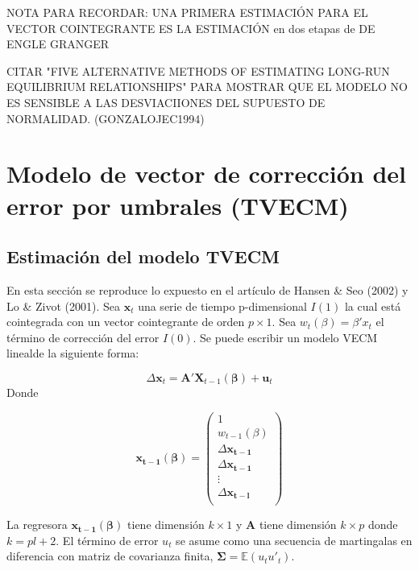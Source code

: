 \documentclass[12pt, twoside]{book}\usepackage[]{graphicx}\usepackage[]{color}
\numberwithin{equation}{section}
\numberwithin{theorem}{section}
\numberwithin{teorema}{section}
\numberwithin{defi}{section}
\numberwithin{prop}{section}
\numberwithin{defi}{section}
\theoremstyle{plain}
\begin{document}
NOTA PARA RECORDAR: UNA PRIMERA ESTIMACIÓN PARA EL VECTOR COINTEGRANTE ES LA ESTIMACIÓN en dos etapas de DE ENGLE GRANGER

CITAR "FIVE ALTERNATIVE METHODS OF ESTIMATING LONG-RUN EQUILIBRIUM RELATIONSHIPS" PARA MOSTRAR QUE EL MODELO NO ES SENSIBLE A LAS DESVIACIIONES DEL SUPUESTO DE NORMALIDAD. (GONZALOJEC1994)

\section{Modelo de vector de corrección del error por umbrales (TVECM)}
\subsection{Estimación del modelo TVECM}

En esta sección se reproduce lo expuesto en el artículo de Hansen \& Seo (2002) y Lo \& Zivot (2001). Sea $\mathbf{x}_{t}$ una serie de tiempo p-dimensional $I(1)$ la cual está cointegrada con un vector cointegrante de orden $p\times 1$. Sea $w_{t}(\beta)=\beta'x_{t}$ el término de corrección del error $I(0)$. Se puede escribir un modelo VECM linealde la siguiente forma: 

\begin{equation}
\Delta \mathbf{x}_{t} = \mathbf{A'X}_{t-1}(\boldsymbol{\beta})+\mathbf{u}_{t}
\end{equation}
Donde 

\begin{equation}
\mathbf{x_{t-1}}(\boldsymbol{\beta}) = \left(\begin{array}{c} 1 \\ w_{t-1}(\beta) \\ %
                                                            \Delta \mathbf{x_{t-1}} \\ %
                                                            \Delta \mathbf{x_{t-1}} \\ %
                                                            \vdots \\ %
                                                            \Delta \mathbf{x_{t-l}} \\ %
                                                            \end{array}\right)
\end{equation}

La regresora $\mathbf{x_{t-1}}(\boldsymbol{\beta})$ tiene dimensión $k\times 1$ y $\mathbf{A}$ tiene dimensión $k\times p$ donde $k=pl+2$. El término de error $u_{t}$ se asume como una secuencia de martingalas en diferencia con matriz de covarianza finita, $\boldsymbol{\Sigma} = \mathbb{E}(u_{t}u'_{t})$. 
\end{document}
